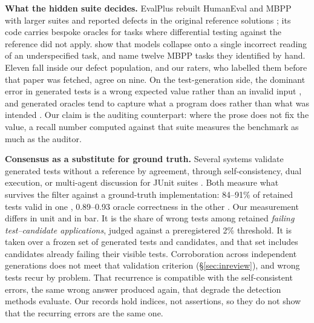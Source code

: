\textbf{What the hidden suite decides.} EvalPlus rebuilt HumanEval and MBPP with larger suites and
reported defects in the original reference solutions \citep{liu2023evalplus}; its code carries
bespoke oracles for tasks where differential testing against the reference did not apply.
\citet{richter2026collapse} show that models collapse onto a single incorrect reading of an
underspecified task, and name twelve MBPP tasks they identified by hand. Eleven fall inside our
defect population, and our raters, who labelled them before that paper was fetched, agree on nine.
On the test-generation side, the dominant error in generated tests is a wrong expected value
rather than an invalid input \citep{xiong2023testing}, and generated oracles tend to capture what
a program does rather than what was intended \citep{konstantinou2024oracles}. Our claim is the
auditing counterpart: where the prose does not fix the value, a recall number computed against
that suite measures the benchmark as much as the auditor.

\textbf{Consensus as a substitute for ground truth.} Several systems validate generated tests
without a reference by agreement, through self-consistency, dual execution, or multi-agent
discussion for {JUnit} suites \citep{taherkhani2026consistency, xu2025consensus}. Both measure what
survives the filter against a ground-truth implementation: 84--91\% of retained tests valid in one
\citep{taherkhani2026consistency}, 0.89--0.93 oracle correctness in the other
\citep{xu2025consensus}. Our measurement differs in unit and in bar. It is the share of wrong tests
among retained \emph{failing test--candidate applications}, judged against a preregistered 2\%
threshold. It is taken over a frozen set of generated tests and candidates, and that set includes
candidates already failing their visible tests. Corroboration across independent generations does not meet that validation criterion
(\S\ref{sec:inreview}), and wrong tests recur by problem. That recurrence is compatible with the
self-consistent errors, the same wrong answer produced again, that degrade the detection methods
\citet{tan2025consistent} evaluate. Our records hold indices, not assertions, so they
do not show that the recurring errors are the same one.

